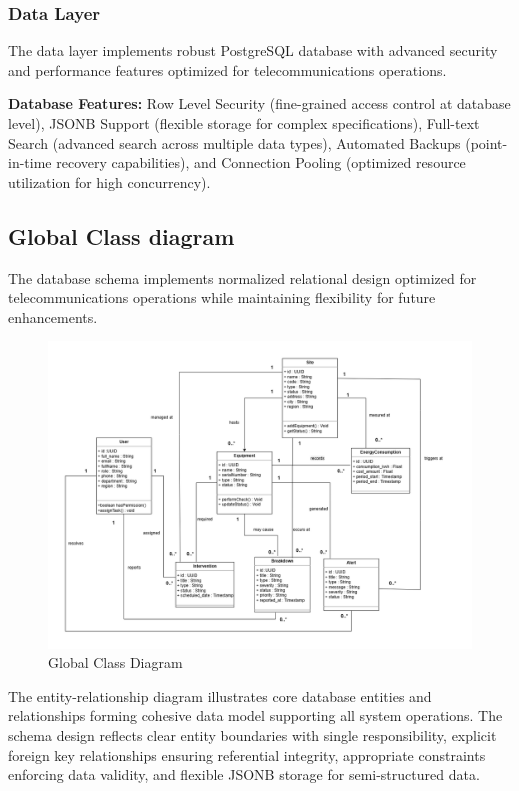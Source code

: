 \subsubsection{Data Layer}

The data layer implements robust PostgreSQL database with advanced security and performance features optimized for telecommunications operations.

\textbf{Database Features:} Row Level Security (fine-grained access control at database level), JSONB Support (flexible storage for complex specifications), Full-text Search (advanced search across multiple data types), Automated Backups (point-in-time recovery capabilities), and Connection Pooling (optimized resource utilization for high concurrency).

\subsection{Global Class diagram}

The database schema implements normalized relational design optimized for telecommunications operations while maintaining flexibility for future enhancements.

\begin{figure}[H]
    \centering
    \includegraphics[width=1\linewidth]{img/chap_02/database_er_diagram.png}
    \caption{Global Class Diagram}
    \label{fig:database_er_diagram}
\end{figure}

The entity-relationship diagram illustrates core database entities and relationships forming cohesive data model supporting all system operations. The schema design reflects clear entity boundaries with single responsibility, explicit foreign key relationships ensuring referential integrity, appropriate constraints enforcing data validity, and flexible JSONB storage for semi-structured data.

